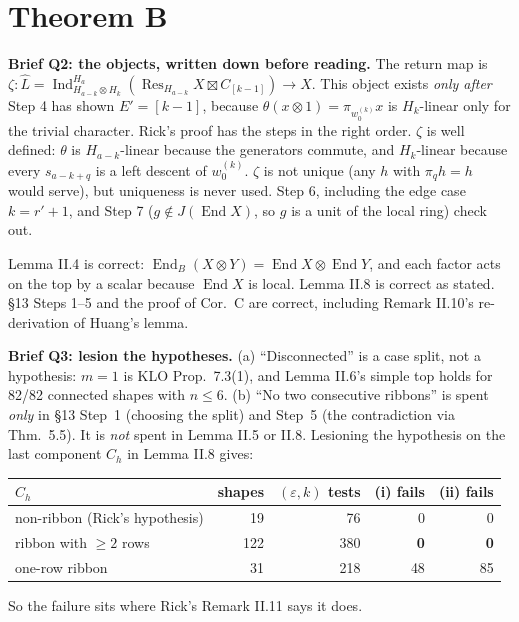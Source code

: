 \documentclass[11pt]{article}
\newcommand{\Ind}{\operatorname{Ind}}
\newcommand{\Res}{\operatorname{Res}}
\newcommand{\End}{\operatorname{End}}
\begin{document}
\section{Theorem B}
\textbf{Brief Q2: the objects, written down before reading.} The return map is
$\zeta:\widehat L=\Ind_{H_{a-k}\otimes H_k}^{H_a}(\Res_{H_{a-k}}X\boxtimes C_{[k-1]})\to X$.
This object exists \emph{only after} Step 4 has shown $E'=[k-1]$, because
$\theta(x\otimes1)=\pi_{w_0^{(k)}}x$ is $H_k$-linear only for the trivial character. Rick's proof
has the steps in the right order. $\zeta$ is well defined: $\theta$ is $H_{a-k}$-linear because the
generators commute, and $H_k$-linear because every $s_{a-k+q}$ is a left descent of $w_0^{(k)}$.
$\zeta$ is not unique (any $h$ with $\pi_qh=h$ would serve), but uniqueness is never used. Step 6,
including the edge case $k=r'+1$, and Step 7 ($g\notin J(\End X)$, so $g$ is a unit of the local
ring) check out.

Lemma II.4 is correct: $\End_B(X\otimes Y)=\End X\otimes\End Y$, and each factor acts on the top
by a scalar because $\End X$ is local. Lemma II.8 is correct as stated. \S13 Steps 1--5 and the
proof of Cor.~C are correct, including Remark II.10's re-derivation of Huang's lemma.

\textbf{Brief Q3: lesion the hypotheses.} (a) ``Disconnected'' is a case split, not a hypothesis:
$m=1$ is KLO Prop.~7.3(1), and Lemma II.6's simple top holds for 82/82 connected shapes with
$n\le6$. (b) ``No two consecutive ribbons'' is spent \emph{only} in \S13 Step~1 (choosing the
split) and Step~5 (the contradiction via Thm.~5.5). It is \emph{not} spent in Lemma II.5 or II.8.
Lesioning the hypothesis on the last component $C_h$ in Lemma II.8 gives:
\begin{center}\small
\begin{tabular}{@{}lrrrr@{}}\toprule
$C_h$ & shapes & $(\varepsilon,k)$ tests & (i) fails & (ii) fails\\\midrule
non-ribbon (Rick's hypothesis) & 19 & 76 & 0 & 0\\
ribbon with $\ge2$ rows & 122 & 380 & \textbf{0} & \textbf{0}\\
one-row ribbon & 31 & 218 & 48 & 85\\\bottomrule
\end{tabular}
\end{center}
So the failure sits where Rick's Remark II.11 says it does.
\end{document}
